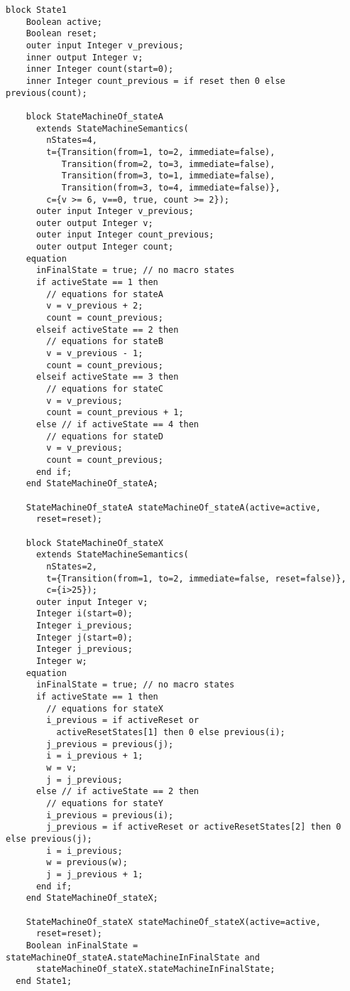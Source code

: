 \begin{example}
\begin{lstlisting}[language=modelica]
  block State1
    Boolean active;
    Boolean reset;
    outer input Integer v_previous;
    inner output Integer v;
    inner Integer count(start=0);
    inner Integer count_previous = if reset then 0 else previous(count);

    block StateMachineOf_stateA
      extends StateMachineSemantics(
        nStates=4,
        t={Transition(from=1, to=2, immediate=false),
           Transition(from=2, to=3, immediate=false),
           Transition(from=3, to=1, immediate=false),
           Transition(from=3, to=4, immediate=false)},
        c={v >= 6, v==0, true, count >= 2});
      outer input Integer v_previous;
      outer output Integer v;
      outer input Integer count_previous;
      outer output Integer count;
    equation
      inFinalState = true; // no macro states
      if activeState == 1 then
        // equations for stateA
        v = v_previous + 2;
        count = count_previous;
      elseif activeState == 2 then
        // equations for stateB
        v = v_previous - 1;
        count = count_previous;
      elseif activeState == 3 then
        // equations for stateC
        v = v_previous;
        count = count_previous + 1;
      else // if activeState == 4 then
        // equations for stateD
        v = v_previous;
        count = count_previous;
      end if;
    end StateMachineOf_stateA;

    StateMachineOf_stateA stateMachineOf_stateA(active=active,
      reset=reset);

    block StateMachineOf_stateX
      extends StateMachineSemantics(
        nStates=2,
        t={Transition(from=1, to=2, immediate=false, reset=false)},
        c={i>25});
      outer input Integer v;
      Integer i(start=0);
      Integer i_previous;
      Integer j(start=0);
      Integer j_previous;
      Integer w;
    equation
      inFinalState = true; // no macro states
      if activeState == 1 then
        // equations for stateX
        i_previous = if activeReset or
          activeResetStates[1] then 0 else previous(i);
        j_previous = previous(j);
        i = i_previous + 1;
        w = v;
        j = j_previous;
      else // if activeState == 2 then
        // equations for stateY
        i_previous = previous(i);
        j_previous = if activeReset or activeResetStates[2] then 0 else previous(j);
        i = i_previous;
        w = previous(w);
        j = j_previous + 1;
      end if;
    end StateMachineOf_stateX;

    StateMachineOf_stateX stateMachineOf_stateX(active=active,
      reset=reset);
    Boolean inFinalState = stateMachineOf_stateA.stateMachineInFinalState and
      stateMachineOf_stateX.stateMachineInFinalState;
  end State1;


\end{lstlisting}
\end{example}
